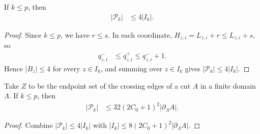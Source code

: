 \begin{lemma}
    \label{thm:area_law_primary_pitch_count}
    \leanok
    If $k\le p$, then
    \begin{align}
        |\mathcal P_k| & \le4|I_k|.
    \end{align}
\end{lemma}
\begin{proof}\leanok
    Since $k\le p$, we have $r\le s$. In each coordinate,
    $H_{z,i}=L_{z,i}+r\le L_{z,i}+s$, so
    \begin{align}
        q_{z,i}^- & \le q_{z,i}^+\le q_{z,i}^-+1.
    \end{align}
    Hence $|B_z|\le4$ for every $z\in I_k$, and summing over $z\in I_k$ gives
    $|\mathcal P_k|\le4|I_k|$.
\end{proof}

\begin{lemma}
    \label{thm:area_law_primary_boundary_count}
    \leanok
    Take $Z$ to be the endpoint set of the crossing edges of a cut $A$
    in a finite domain $\Lambda$. If $k\le p$, then
    \begin{align}
        |\mathcal P_k| & \le32(2C_0+1)^2|\partial_\Lambda A|.
    \end{align}
\end{lemma}
\begin{proof}\leanok
    Combine $|\mathcal P_k|\le4|I_k|$ with
    $|I_k|\le8(2C_0+1)^2|\partial_\Lambda A|$.
\end{proof}


